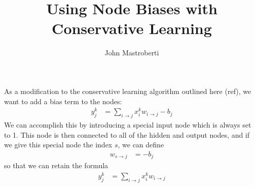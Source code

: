 \documentclass[12pt]{article}
\begin{document}
\title{Using Node Biases with Conservative Learning}
\author{John Mastroberti}
 
\maketitle

As a modification to the conservative learning algorithm outlined here (ref), we want to add a bias term to the nodes:
\begin{align}
y_j^k & = \sum_{i \rightarrow j} x_i^k w_{i \rightarrow j} - b_j
\end{align}
We can accomplish this by introducing a special input node which is always set to 1.
This node is then connected to all of the hidden and output nodes, 
and if we give this special node the index $s$, we can define
\begin{align*}
w_{s \rightarrow j} & = -b_j
\end{align*}
so that we can retain the formula 
\begin{align*}
y_j^k & = \sum_{i \rightarrow j} x_i^k w_{i \rightarrow j}
\end{align*}
\end{document}
